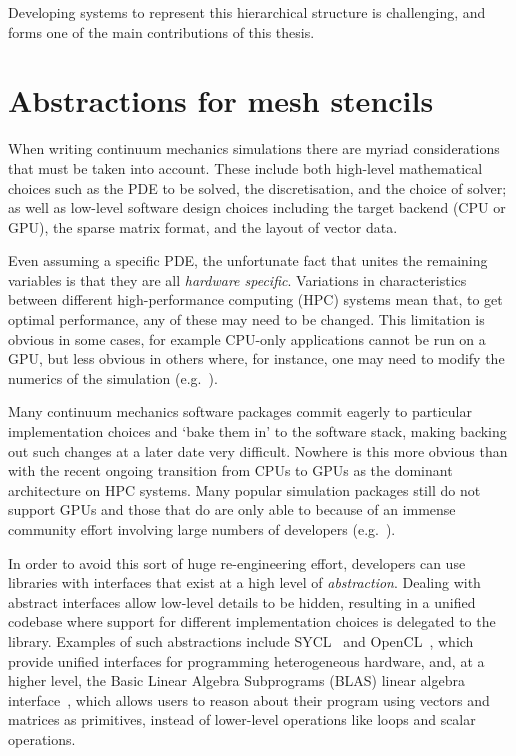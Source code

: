 \documentclass[thesis]{subfiles}
\begin{document}
Developing systems to represent this hierarchical structure is challenging, and forms one of the main contributions of this thesis.

\section{Abstractions for mesh stencils}
\label{sec:introduction_software}

When writing continuum mechanics simulations there are myriad considerations that must be taken into account.
These include both high-level mathematical choices such as the PDE to be solved, the discretisation, and the choice of solver; as well as low-level software design choices including the target backend (CPU or GPU), the sparse matrix format, and the layout of vector data.

Even assuming a specific PDE, the unfortunate fact that unites the remaining variables is that they are all \emph{hardware specific}.
Variations in characteristics between different high-performance computing (HPC) systems mean that, to get optimal performance, any of these may need to be changed.
This limitation is obvious in some cases, for example CPU-only applications cannot be run on a GPU, but less obvious in others where, for instance, one may need to modify the numerics of the simulation (e.g.~\cite{betteridgeCodeGenerationProductive2021}).

Many continuum mechanics software packages commit eagerly to particular implementation choices and `bake them in' to the software stack, making backing out such changes at a later date very difficult.
Nowhere is this more obvious than with the recent ongoing transition from CPUs to GPUs as the dominant architecture on HPC systems.
Many popular simulation packages still do not support GPUs and those that do are only able to because of an immense community effort involving large numbers of developers (e.g.~\cite{millsPETScTAODevelopments2024,millsPerformancePortablePETScGPUbased2020,brownLibCEEDFastAlgebra2021,abdelfattahGPUAlgorithmsEfficient2021}).

In order to avoid this sort of huge re-engineering effort, developers can use libraries with interfaces that exist at a high level of \emph{abstraction}.
Dealing with abstract interfaces allow low-level details to be hidden, resulting in a unified codebase where support for different implementation choices is delegated to the library.
Examples of such abstractions include SYCL~\cite{SYCL2020Specification2020} and OpenCL~\cite{stoneOpenCLParallelProgramming2010a}, which provide unified interfaces for programming heterogeneous hardware, and, at a higher level, the Basic Linear Algebra Subprograms (BLAS) linear algebra interface~\cite{lawsonBasicLinearAlgebra1979}, which allows users to reason about their program using vectors and matrices as primitives, instead of lower-level operations like loops and scalar operations.
\end{document}
